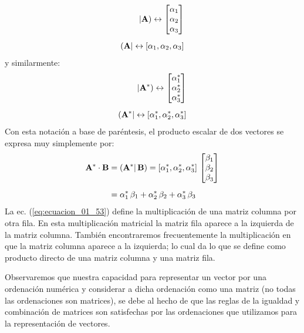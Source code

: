 \begin{align}
\begin{aligned}
    | \vb{A} ) \leftrightarrow \mqty[ \alpha_{1} \\ \alpha_{2} \\ \alpha_{3} ] \\[0.5em]
    ( \vb{A} | \leftrightarrow  \left[ \alpha_{1}, \alpha_{2}, \alpha_{3} \right]
\end{aligned}
\label{eq:ecuacion_01_51}
\end{align}
y similarmente:
\begin{align}
\begin{aligned}
    | \vb{A}^{*} ) \leftrightarrow \mqty[ \alpha_{1}^{*} \\ \alpha_{2}^{*} \\ \alpha_{3}^{*} ] \\[0.5em]
    ( \vb{A}^{*} | \leftrightarrow  \left[ \alpha_{1}^{*}, \alpha_{2}^{*}, \alpha_{3}^{*} \right]
\end{aligned}
\label{eq:ecuacion_01_52}
\end{align}
Con esta notación a base de paréntesis, el producto escalar de dos vectores se expresa muy simplemente por:
\begin{align}
\begin{aligned}
\vb{A}^{*} \cdot \vb{B} &= \left( \vb{A}^{*} | \, \vb{B} \right) = \left[ \alpha_{1}^{*}, \alpha_{2}^{*}, \alpha_{3}^{*} \right] \, \mqty[ \beta_{1} \\ \beta_{2} \\ \beta_{3} ] \\[0.5em]
&= \alpha_{1}^{*} \, \beta_{1} + \alpha_{2}^{*} \, \beta_{2} + \alpha_{3}^{*} \, \beta_{3}
\end{aligned}
\label{eq:ecuacion_01_53}
\end{align}
La ec. (\ref{eq:ecuacion_01_53}) define la multiplicación de una matriz columna por otra fila. En esta multiplicación matricial la matriz fila aparece a la izquierda de la matriz columna. También encontraremos frecuentemente la multiplicación en que la matriz columna aparece a la izquierda; lo cual da lo que se define como producto directo de una matriz columna y una matriz fila. 
\par
Observaremos que nuestra capacidad para representar un vector por una ordenación numérica y considerar a dicha ordenación como una matriz 
(no todas las ordenaciones son matrices), se debe al hecho de que las reglas de la igualdad y combinación de matrices son satisfechas por las ordenaciones que utilizamos para la representación de vectores.
